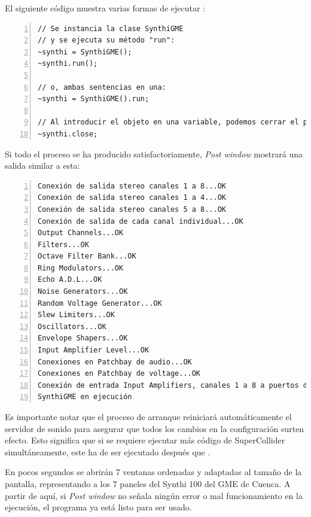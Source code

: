 El siguiente código muestra varias formas de ejecutar \appName:
\begin{lstlisting}[style=SuperCollider-IDE, frame=single,  numbers=left]
// Se instancia la clase SynthiGME
// y se ejecuta su método "run":
~synthi = SynthiGME();
~synthi.run();

// o, ambas sentencias en una:
~synthi = SynthiGME().run;

// Al introducir el objeto en una variable, podemos cerrar el programa ejecutando el método "close":
~synthi.close;
\end{lstlisting}

Si todo el proceso se ha producido satisfactoriamente, \textit{Post window} mostrará una salida similar a esta:

\begin{lstlisting}[frame=single, numbers=left]
Conexión de salida stereo canales 1 a 8...OK
Conexión de salida stereo canales 1 a 4...OK
Conexión de salida stereo canales 5 a 8...OK
Conexión de salida de cada canal individual...OK
Output Channels...OK
Filters...OK
Octave Filter Bank...OK
Ring Modulators...OK
Echo A.D.L...OK
Noise Generators...OK
Random Voltage Generator...OK
Slew Limiters...OK
Oscillators...OK
Envelope Shapers...OK
Input Amplifier Level...OK
Conexiones en Patchbay de audio...OK
Conexiones en Patchbay de voltage...OK
Conexión de entrada Input Amplifiers, canales 1 a 8 a puertos de SC...OK
SynthiGME en ejecución
\end{lstlisting}



Es importante notar que el proceso de arranque reiniciará automáticamente el servidor de sonido para asegurar que todos los cambios en la configuración surten efecto. Esto significa que si se requiere ejecutar más código de SuperCollider simultáneamente, este ha de ser ejecutado después que \appName. 

En pocos segundos se abrirán 7 ventanas ordenadas y adaptadas al tamaño de la pantalla, representando a los 7 paneles del Synthi 100 del GME de Cuenca. A partir de aquí, si \textit{Post window} no señala ningún error o mal funcionamiento en la ejecución, el programa ya está listo para ser usado.




